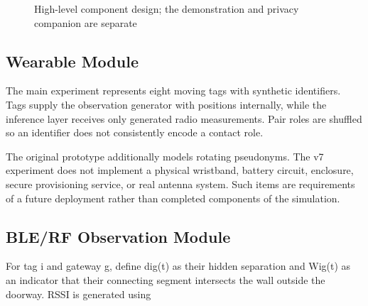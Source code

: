 \documentclass[12pt,a4paper]{report}
\begin{document}
\begin{figure}[htbp]
\centering
{}
\caption{High-level component design; the demonstration and privacy companion are separate}\label{fig:highlevel}
\end{figure}


\subsection{Wearable Module}
The main experiment represents eight moving tags with synthetic identifiers. Tags supply the observation generator with positions internally, while the inference layer receives only generated radio measurements. Pair roles are shuffled so an identifier does not consistently encode a contact role.

The original prototype additionally models rotating pseudonyms. The v7 experiment does not implement a physical wristband, battery circuit, enclosure, secure provisioning service, or real antenna system. Such items are requirements of a future deployment rather than completed components of the simulation.

\subsection{BLE/RF Observation Module}
For tag i and gateway g, define dig(t) as their hidden separation and Wig(t) as an indicator that their connecting segment intersects the wall outside the doorway. RSSI is generated using
\end{document}

